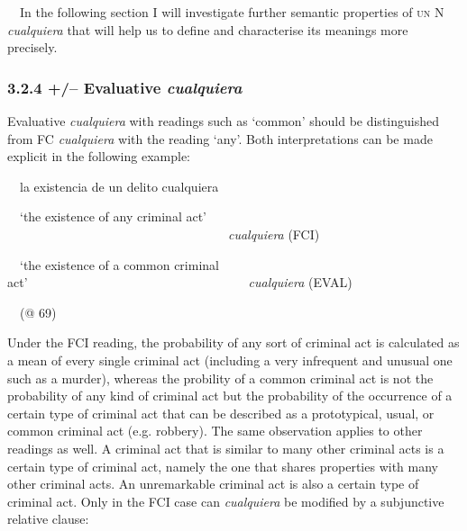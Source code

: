 \begin{styleStandard}
\ \ In the following section I will investigate further semantic properties of \textsc{un} N \textit{cualquiera} that will help us to define and characterise its meanings more precisely. 
\end{styleStandard}

\subsubsection[3.2.4 +/– Evaluative cualquiera]{\textbf{3.2.4 +/– Evaluative }\textbf{\textit{cualquiera}}}
\begin{styleStandard}
Evaluative\textit{ cualquiera} with readings such as ‘common’ should be distinguished from FC \textit{cualquiera} with the reading ‘any’. Both interpretations can be made explicit in the following example:
\end{styleStandard}

\begin{styleStandard}
\ \ la existencia de un delito cualquiera
\end{styleStandard}

\begin{styleStandard}
\ \ ‘the existence of any criminal act’ \ \  \ \ \ \ \ \ \ \ \ \ \ \ \ \ \ \ \ \ \ \ \ \ \ \ \ \ \ \ \ \ \ \ \ \textit{cualquiera} (FCI)
\end{styleStandard}

\begin{styleStandard}
\ \ ‘the existence of a common criminal act’\ \  \ \ \ \ \ \ \ \ \ \ \ \ \ \ \ \ \ \ \ \ \ \ \ \ \ \ \ \ \ \ \ \ \ \textit{cualquiera} (EVAL)
\end{styleStandard}

\begin{styleStandard}
\ \ (@ 69)
\end{styleStandard}

\begin{styleStandard}
Under the FCI reading, the probability of any sort of criminal act is calculated as a mean of every single criminal act (including a very infrequent and unusual one such as a murder), whereas the probility of a common criminal act is not the probability of any kind of criminal act but the probability of the occurrence of a certain type of criminal act that can be described as a prototypical, usual, or common criminal act (e.g. robbery). The same observation applies to other readings as well. A criminal act that is similar to many other criminal acts is a certain type of criminal act, namely the one that shares properties with many other criminal acts. An unremarkable criminal act is also a certain type of criminal act. Only in the FCI case can \textit{cualquiera} be modified by a subjunctive relative clause:
\end{styleStandard}

